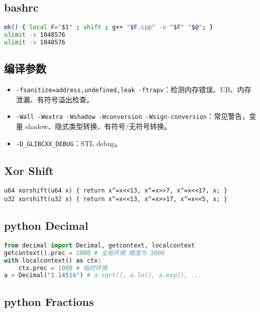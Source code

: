 \documentclass[a4paper,landscape,twocolumn]{ctexart}
\begin{document}
\subsection{bashrc}

\begin{lstlisting}[language=sh]
mk() { local F="$1" ; shift ; g++ "$F.cpp" -o "$F" "$@"; }
ulimit -s 1048576
ulimit -v 1048576
\end{lstlisting}

\subsection{编译参数}

\begin{itemize}
\item \texttt{-fsanitize=address,undefined,leak -ftrapv}：检测内存错误、UB、内存泄漏、有符号溢出检查。
\item \texttt{-Wall -Wextra -Wshadow -Wconversion -Wsign-conversion}：常见警告，变量 shadow、隐式类型转换、有符号/无符号转换。
\item \texttt{-D\_GLIBCXX\_DEBUG}：STL debug。
\end{itemize}

\subsection{Xor \space Shift}

\begin{lstlisting}
u64 xorshift(u64 x) { return x^=x<<13, x^=x>>7, x^=x<<17, x; }
u32 xorshift(u32 x) { return x^=x<<13, x^=x>>17, x^=x<<5, x; }
\end{lstlisting}

\subsection{python Decimal}

\begin{lstlisting}[language=python]
from decimal import Decimal, getcontext, localcontext
getcontext().prec = 1000 # 全局环境 精度为 1000
with localcontext() as ctx:
	ctx.prec = 1000 # 临时环境
a = Decimal("1.14514") # a.sqrt(), a.ln(), a.exp(), ...
\end{lstlisting}

\subsection{python Fractions}
\end{document}
